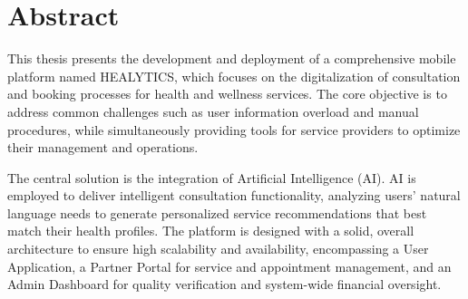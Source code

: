 \section*{Abstract}

\hspace*{0.63cm}This thesis presents the development and deployment of a comprehensive mobile platform named HEALYTICS, which focuses on the digitalization of consultation and booking processes for health and wellness services. The core objective is to address common challenges such as user information overload and manual procedures, while simultaneously providing tools for service providers to optimize their management and operations.

\hspace*{0.63cm}The central solution is the integration of Artificial Intelligence (AI). AI is employed to deliver intelligent consultation functionality, analyzing users' natural language needs to generate personalized service recommendations that best match their health profiles. The platform is designed with a solid, overall architecture to ensure high scalability and availability, encompassing a User Application, a Partner Portal for service and appointment management, and an Admin Dashboard for quality verification and system-wide financial oversight.
\clearpage

